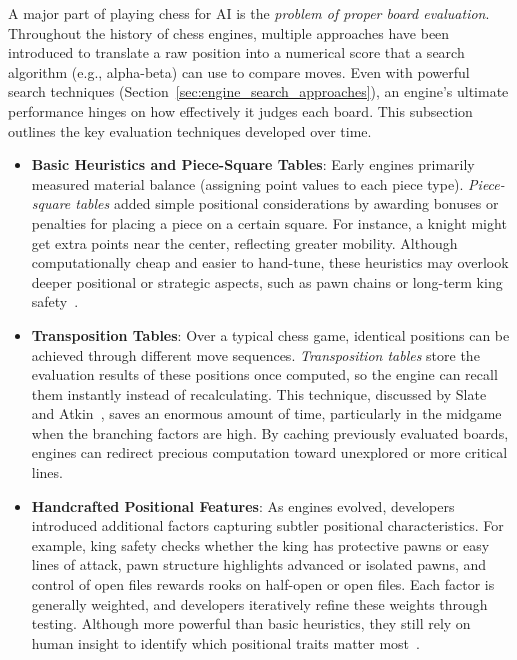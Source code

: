 \documentclass[12pt,a4paper]{article}
\begin{document}
A major part of playing chess for AI is the \emph{problem of proper board evaluation}. Throughout the history of chess engines, multiple approaches have been introduced to translate a raw position into a numerical score that a search algorithm (e.g., alpha-beta) can use to compare moves. Even with powerful search techniques (Section~\ref{sec:engine_search_approaches}), an engine’s ultimate performance hinges on how effectively it judges each board. This subsection outlines the key evaluation techniques developed over time.

\begin{itemize}
  \item \textbf{Basic Heuristics and Piece-Square Tables}:  
  Early engines primarily measured material balance (assigning point values to each piece type). \emph{Piece-square tables} added simple positional considerations by awarding bonuses or penalties for placing a piece on a certain square. For instance, a knight might get extra points near the center, reflecting greater mobility. Although computationally cheap and easier to hand-tune, these heuristics may overlook deeper positional or strategic aspects, such as pawn chains or long-term king safety~\cite{Shannon1950}.

  \item \textbf{Transposition Tables}:  
  Over a typical chess game, identical positions can be achieved through different move sequences. \emph{Transposition tables} store the evaluation results of these positions once computed, so the engine can recall them instantly instead of recalculating. This technique, discussed by Slate and Atkin~\cite{Slate1977}, saves an enormous amount of time, particularly in the midgame when the branching factors are high. By caching previously evaluated boards, engines can redirect precious computation toward unexplored or more critical lines.

  \item \textbf{Handcrafted Positional Features}:  
  As engines evolved, developers introduced additional factors capturing subtler positional characteristics. For example, king safety checks whether the king has protective pawns or easy lines of attack, pawn structure highlights advanced or isolated pawns, and control of open files rewards rooks on half-open or open files. Each factor is generally weighted, and developers iteratively refine these weights through testing. Although more powerful than basic heuristics, they still rely on human insight to identify which positional traits matter most~\cite{LevyNewborn1991}.



\end{itemize}
\end{document}

